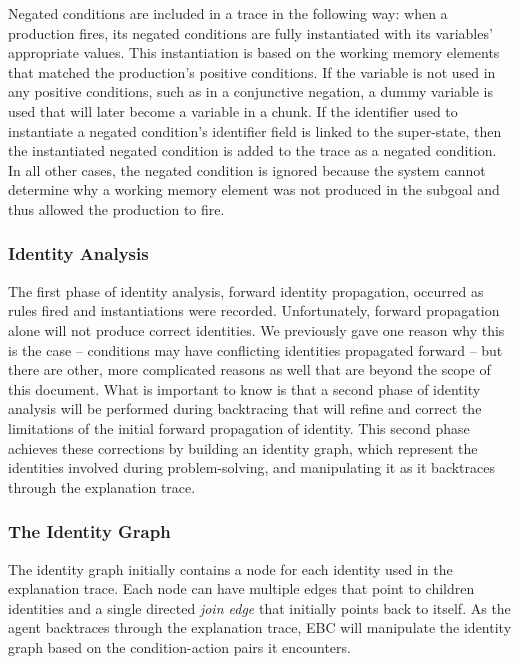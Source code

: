 Negated conditions are included in a trace in the following way: when a production fires, its negated conditions are fully instantiated with its variables' appropriate values. This instantiation is based on the working memory elements that matched the production's positive conditions. If the variable is not used in any positive conditions, such as in a conjunctive negation, a dummy variable is used that will later become a variable in a chunk.  If the identifier used to instantiate a negated condition's identifier field is linked to the super-state, then the instantiated negated condition is added to the trace as a negated condition. In all other cases, the negated condition is ignored because the system cannot determine why a working memory element was not produced in the subgoal and thus allowed the production to fire.

\subsubsection{Identity Analysis}

The first phase of identity analysis, forward identity propagation, occurred as rules fired and instantiations were recorded.  Unfortunately, forward propagation alone will not produce correct identities.  We previously gave one reason why this is the case -- conditions may have conflicting identities propagated forward -- but there are other, more complicated reasons as well that are beyond the scope of this document. What is important to know is that a second phase of identity analysis will be performed during backtracing that will refine and correct the limitations of the initial forward propagation of identity. This second phase achieves these corrections by building an identity graph, which represent the identities involved during problem-solving, and manipulating it as it backtraces through the explanation trace.

\subsubsection*{The Identity Graph}

The identity graph initially contains a node for each identity used in the explanation trace.  Each node can have multiple edges that point to children identities and a single directed \textit{join edge} that initially points back to itself.  As the agent backtraces through the explanation trace, EBC will manipulate the identity graph based on the condition-action pairs it encounters.

